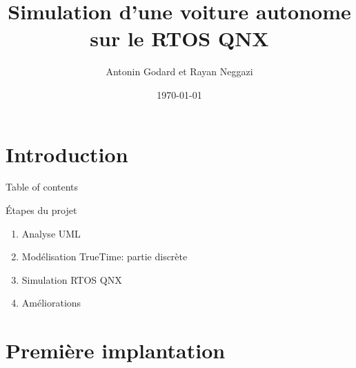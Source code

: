 \documentclass{beamer}
\begin{document}
\title[Simulation d’une voiture autonome sur le RTOS QNX]{Simulation d’une voiture autonome sur le RTOS QNX} 
\author{ \vspace{4em} Antonin Godard et Rayan Neggazi} 
\date{\today} 

\begin{frame}[plain]
  \titlepage
\end{frame}




\section{Introduction}

\begin{frame}{Table of contents}
  \tableofcontents
\end{frame}


\begin{frame}{Étapes du projet}
    \begin{enumerate}
        \item Analyse UML
        \item Modélisation TrueTime: partie discrète
        \item Simulation RTOS QNX
        \item Améliorations
    \end{enumerate}
\end{frame}

\section{Première implantation}
\end{document}
